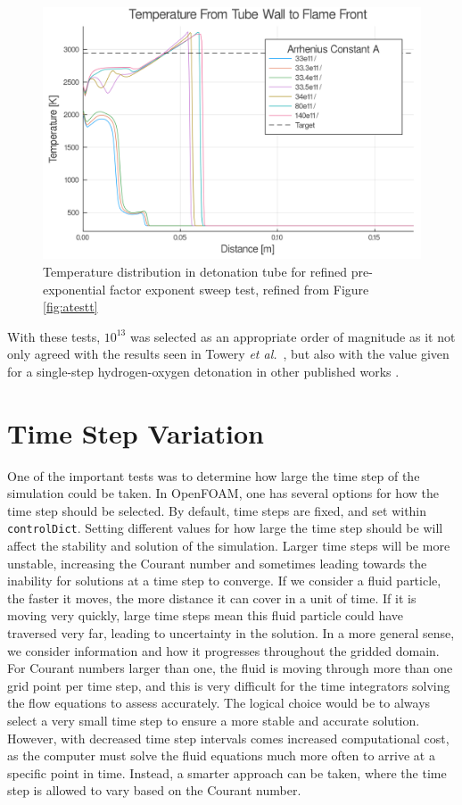 \begin{figure}
\centering
\includegraphics[width=0.85\linewidth]{./figs/Atest_refined/t.png}
\caption{Temperature distribution in detonation tube for refined pre-exponential factor exponent sweep test, refined from Figure \ref{fig:atestt}}
\label{fig:atestrt}
\end{figure}

With these tests, \(10^{13}\) was selected as an appropriate order of magnitude as it not only agreed with the results seen in Towery \textit{et al.}~\cite{towery1}, but also with the value given for a single-step hydrogen-oxygen detonation in other published works \cite{hashemi}. 




\section{Time Step Variation}
One of the important tests was to determine how large the time step of the simulation could be taken. In OpenFOAM, one has several options for how the time step should be selected. By default, time steps are fixed, and set within \verb|controlDict|. Setting different values for how large the time step should be will affect the stability and solution of the simulation. Larger time steps will be more unstable, increasing the Courant number and sometimes leading towards the inability for solutions at a time step to converge. If we consider a fluid particle, the faster it moves, the more distance it can cover in a unit of time. If it is moving very quickly, large time steps mean this fluid particle could have traversed very far, leading to uncertainty in the solution. In a more general sense, we consider information and how it progresses throughout the gridded domain. For Courant numbers larger than one, the fluid is moving through more than one grid point per time step, and this is very difficult for the time integrators solving the flow equations to assess accurately. The logical choice would be to always select a very small time step to ensure a more stable and accurate solution. However, with decreased time step intervals comes increased computational cost, as the computer must solve the fluid equations much more often to arrive at a specific point in time. Instead, a smarter approach can be taken, where the time step is allowed to vary based on the Courant number. 

